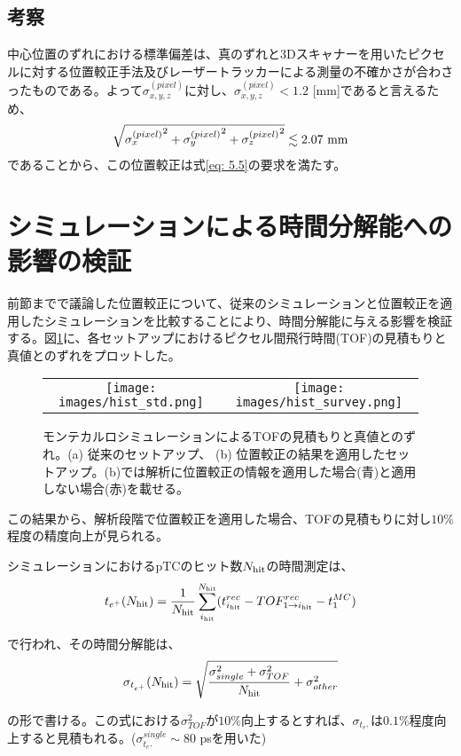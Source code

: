 \documentclass[Yonemoto_master.tex]{subfiles}
\begin{document}
\subsection{考察}

中心位置のずれにおける標準偏差は、真のずれと3Dスキャナーを用いたピクセルに対する位置較正手法及びレーザートラッカーによる測量の不確かさが合わさったものである。よって$\sigma_{x,y,z}^{(pixel)}$に対し、$\sigma_{x,y,z}^{(pixel)} < 1.2$ [mm]であると言えるため、
\begin{align}
\sqrt{{\sigma_x^{(pixel)}}^2 + {\sigma_y^{(pixel)}}^2 + {\sigma_z^{(pixel)}}^2} \lesssim  2.07 \ {\rm mm}
\end{align}
であることから、この位置較正は式\ref{eq: 5.5}の要求を満たす。

\section{シミュレーションによる時間分解能への影響の検証}
前節までで議論した位置較正について、従来のシミュレーションと位置較正を適用したシミュレーションを比較することにより、時間分解能に与える影響を検証する。図\ref{fig: TOF_res}に、各セットアップにおけるピクセル間飛行時間(TOF)の見積もりと真値とのずれをプロットした。

\begin{figure}[h]
    \begin{tabular}{cc}
      \begin{minipage}[t]{0.45\hsize}
        \centering
        \texttt{[image: images/hist\_std.png]}
        \caption*{(a)}
      \end{minipage} &
      \begin{minipage}[t]{0.45\hsize}
        \centering
        \texttt{[image: images/hist\_survey.png]}
         \caption*{(b)}
      \end{minipage}
    \end{tabular}
    \caption{モンテカルロシミュレーションによるTOFの見積もりと真値とのずれ。(a) 従来のセットアップ、 (b) 位置較正の結果を適用したセットアップ。(b)では解析に位置較正の情報を適用した場合(青)と適用しない場合(赤)を載せる。}
    \label{fig: TOF_res}
 \end{figure}

この結果から、解析段階で位置較正を適用した場合、TOFの見積もりに対し$10\%$程度の精度向上が見られる。

シミュレーションにおけるpTCのヒット数$N_{\rm hit}$の時間測定は、
\begin{align}
t_{e^+} (N_{\rm hit}) = \frac{1}{N_{\rm hit}} \sum_{i_{\rm hit}}^{N_{\rm hit}} (t_{i_{\rm hit}}^{rec} - TOF_{1 \to i_{\rm hit}}^{rec} - t_1^{MC})
\end{align}

で行われ、その時間分解能は、
\begin{align}
\sigma_{t_{e^+}} (N_{\rm hit}) = \sqrt{\frac{\sigma_{single}^2 + \sigma_{TOF}^2}{N_{\rm hit}} + \sigma_{other}^2}
\end{align}

の形で書ける。この式における$\sigma_{TOF}^2$が$10\%$向上するとすれば、$\sigma_{t_{e^+}}$は$0.1\%$程度向上すると見積もれる。($\sigma_{t_{e^+}}^{single} \sim 80$ psを用いた)
\end{document}
